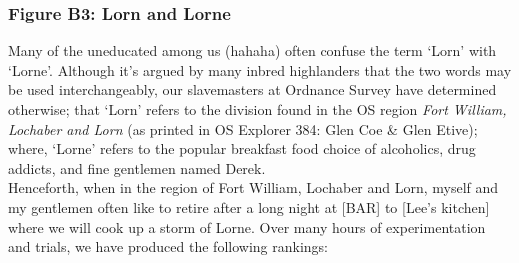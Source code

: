 \documentclass[11pt, english]{article}
\begin{document}
\newpage

		\subsubsection*{Figure B3: Lorn and Lorne}

		Many of the uneducated among us (hahaha) often confuse the term `Lorn' with `Lorne'. Although it's argued by many inbred highlanders that the two words may be used interchangeably, our slavemasters at Ordnance Survey have determined otherwise; that `Lorn' refers to the division found in the OS region \textit{Fort William, Lochaber and Lorn} (as printed in OS Explorer 384: Glen Coe \& Glen Etive); where, `Lorne' refers to the popular breakfast food choice of alcoholics, drug addicts, and fine gentlemen named Derek.\\

		Henceforth, when in the region of Fort William, Lochaber and Lorn, myself and my gentlemen often like to retire after a long night at [BAR] to [Lee's kitchen] where we will cook up a storm of Lorne. Over many hours of experimentation and trials, we have produced the following rankings:
\end{document}
